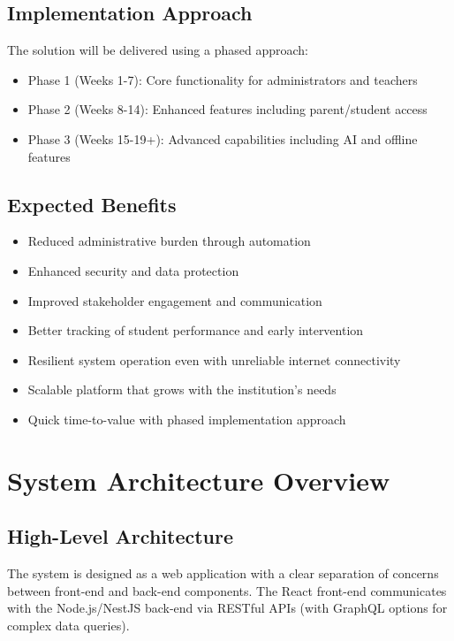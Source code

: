 \documentclass[11pt]{report}
\begin{document}
\section{Implementation Approach}
The solution will be delivered using a phased approach:
\begin{itemize}
    \item Phase 1 (Weeks 1-7): Core functionality for administrators and teachers
    \item Phase 2 (Weeks 8-14): Enhanced features including parent/student access
    \item Phase 3 (Weeks 15-19+): Advanced capabilities including AI and offline features
\end{itemize}

\section{Expected Benefits}
\begin{itemize}
    \item Reduced administrative burden through automation
    \item Enhanced security and data protection
    \item Improved stakeholder engagement and communication
    \item Better tracking of student performance and early intervention
    \item Resilient system operation even with unreliable internet connectivity
    \item Scalable platform that grows with the institution's needs
    \item Quick time-to-value with phased implementation approach
\end{itemize}

\chapter{System Architecture Overview}

\section{High-Level Architecture}

The system is designed as a web application with a clear separation of concerns between front-end and back-end components. The React front-end communicates with the Node.js/NestJS back-end via RESTful APIs (with GraphQL options for complex data queries). 
\end{document}
